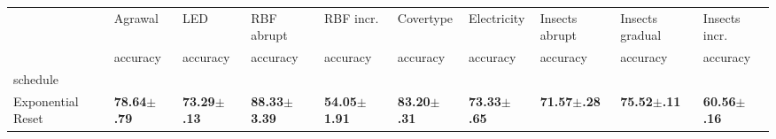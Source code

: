 \begin{tabular}{llllllllll}
    \toprule
                      & Agrawal                 & LED                     & RBF abrupt               & RBF incr.                & Covertype               & Electricity             & Insects abrupt          & Insects gradual         & Insects incr.           \\
                      & accuracy                & accuracy                & accuracy                 & accuracy                 & accuracy                & accuracy                & accuracy                & accuracy                & accuracy                \\
    schedule          &                         &                         &                          &                          &                         &                         &                         &                         &                         \\
    \midrule
    Exponential Reset & \bfseries 78.64$\pm$.79 & \bfseries 73.29$\pm$.13 & \bfseries 88.33$\pm$3.39 & \bfseries 54.05$\pm$1.91 & \bfseries 83.20$\pm$.31 & \bfseries 73.33$\pm$.65 & \bfseries 71.57$\pm$.28 & \bfseries 75.52$\pm$.11 & \bfseries 60.56$\pm$.16 \\
    \bottomrule
\end{tabular}
